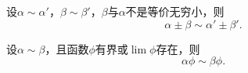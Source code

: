 \begin{proposition}[和差代替规则]\label{theorem:极限.无穷小的比较4}
设\(\alpha\sim\alpha'\)，\(\beta\sim\beta'\)，\(\beta\)与\(\alpha\)不是等价无穷小，则\[
	\alpha\pm\beta\sim\alpha'\pm\beta'.
\]
\end{proposition}

\begin{proposition}[因式代替规则]\label{theorem:极限.无穷小的比较5}
设\(\alpha\sim\beta\)，且函数\(\phi\)有界或\(\lim\phi\)存在，则\[
	\alpha \phi \sim \beta \phi.
\]
\end{proposition}
